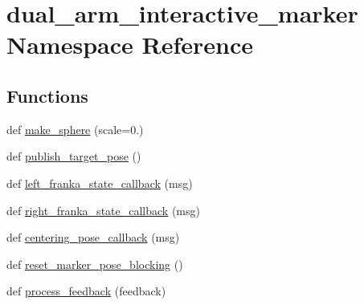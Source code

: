 \hypertarget{namespacedual__arm__interactive__marker}{}\section{dual\+\_\+arm\+\_\+interactive\+\_\+marker Namespace Reference}
\label{namespacedual__arm__interactive__marker}
\subsection*{Functions}
\begin{DoxyCompactItemize}
\item 
def \hyperlink{namespacedual__arm__interactive__marker_a4a4776e18d30b02fcd5aa69cea3e7f87}{make\+\_\+sphere} (scale=0.)
\item 
def \hyperlink{namespacedual__arm__interactive__marker_afe5736dcfad3f21203ce12db0eaf6c87}{publish\+\_\+target\+\_\+pose} ()
\item 
def \hyperlink{namespacedual__arm__interactive__marker_a2b8c14b515389640fd0dfcd9f542bf73}{left\+\_\+franka\+\_\+state\+\_\+callback} (msg)
\item 
def \hyperlink{namespacedual__arm__interactive__marker_a45661200829d9728f63a363b7dc340c0}{right\+\_\+franka\+\_\+state\+\_\+callback} (msg)
\item 
def \hyperlink{namespacedual__arm__interactive__marker_ab9a8983192953298e4070e5fa215d6bd}{centering\+\_\+pose\+\_\+callback} (msg)
\item 
def \hyperlink{namespacedual__arm__interactive__marker_aa2f3e89c8afccb99a7aceee8024f7d6d}{reset\+\_\+marker\+\_\+pose\+\_\+blocking} ()
\item 
def \hyperlink{namespacedual__arm__interactive__marker_afedda6582fc6f2b0bd5c4c1e16dc9251}{process\+\_\+feedback} (feedback)
\end{DoxyCompactItemize}
